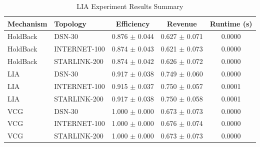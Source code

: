 \begin{table}[h!]
\centering
\caption{LIA Experiment Results Summary}
\begin{tabular}{|l|l|c|c|c|}
\hline
Mechanism & Topology & Efficiency & Revenue & Runtime (s) \\
\hline
HoldBack & DSN-30 & 0.876 $\pm$ 0.044 & 0.627 $\pm$ 0.071 & 0.0000 \\
HoldBack & INTERNET-100 & 0.874 $\pm$ 0.043 & 0.621 $\pm$ 0.073 & 0.0000 \\
HoldBack & STARLINK-200 & 0.874 $\pm$ 0.042 & 0.626 $\pm$ 0.072 & 0.0000 \\
LIA & DSN-30 & 0.917 $\pm$ 0.038 & 0.749 $\pm$ 0.060 & 0.0000 \\
LIA & INTERNET-100 & 0.915 $\pm$ 0.037 & 0.750 $\pm$ 0.057 & 0.0001 \\
LIA & STARLINK-200 & 0.917 $\pm$ 0.038 & 0.750 $\pm$ 0.058 & 0.0001 \\
VCG & DSN-30 & 1.000 $\pm$ 0.000 & 0.673 $\pm$ 0.073 & 0.0000 \\
VCG & INTERNET-100 & 1.000 $\pm$ 0.000 & 0.676 $\pm$ 0.074 & 0.0000 \\
VCG & STARLINK-200 & 1.000 $\pm$ 0.000 & 0.673 $\pm$ 0.073 & 0.0000 \\
\hline
\end{tabular}
\label{tab:results}
\end{table}
